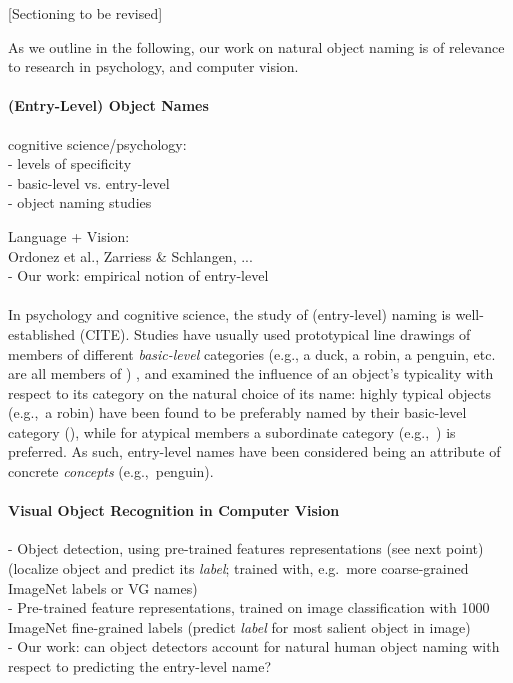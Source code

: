 
[Sectioning to be revised]

As we outline in the following, our work on natural object naming is of relevance to research in psychology, \langvis and computer vision. 

\paragraph{(Entry-Level) Object Names}

cognitive science/psychology:\\
- levels of specificity\\
- basic-level vs. entry-level\\ 
- object naming studies

Language + Vision:\\
Ordonez et al., Zarriess \& Schlangen, ... \\
- Our work: empirical notion of entry-level

\paragraph{}
In psychology and cognitive science, the study of (entry-level) naming is well-established (CITE). 
Studies have usually used prototypical line drawings of members of different \textit{basic-level} categories (e.g., a duck, a robin, a penguin, etc. are all members of ) 
\cite{jolicoeur1984pictures}, and examined the influence of an object's typicality with respect to its category on the natural choice of its name: highly typical objects (e.g.,\ a robin) have been found to be preferably named by their basic-level category (), while for atypical members a subordinate category (e.g.,\ ) is preferred. 
As such, entry-level names have been considered being an attribute of concrete \textit{concepts} (e.g.,\ penguin). 



\paragraph{Visual Object Recognition in Computer Vision}
- Object detection, using pre-trained features representations (see next point) (localize object and predict its \textit{label}; trained with, e.g.\ more coarse-grained ImageNet labels or VG names)\\
- Pre-trained feature representations, trained on image classification with 1000 ImageNet fine-grained labels (predict \textit{label} for most salient object in image)\\
- Our work: can object detectors account for natural human object naming with respect to predicting the entry-level name? 